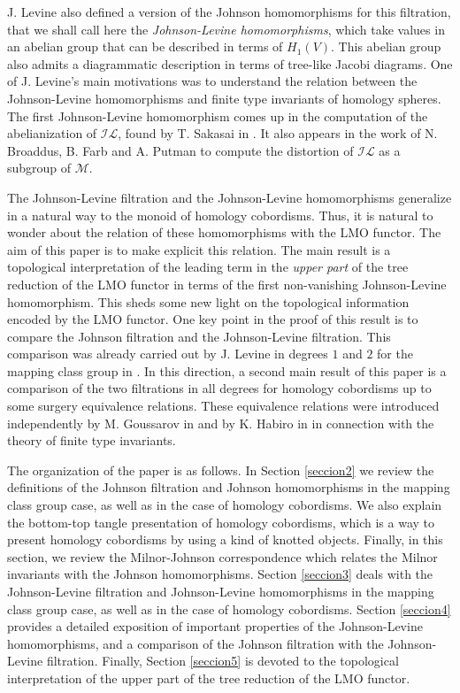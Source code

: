 \documentclass[10pt]{amsart}
\numberwithin{equation}{section}
\numberwithin{equation}{section}
\theoremstyle{definition}
\begin{document}
 J. Levine also  defined a version of the Johnson homomorphisms for this filtration, that we shall call here the  \emph{Johnson-Levine homomorphisms}, which take values in an abelian group  that can be described in terms of $H_1(V)$. This abelian group also admits a diagrammatic description in terms of tree-like Jacobi diagrams. One of J. Levine's  main motivations was to understand the  relation between  the Johnson-Levine homomorphisms  and finite type invariants of homology spheres.   The first Johnson-Levine homomorphism  comes up in the computation of the abelianization of $\mathcal{IL}$, found by T. Sakasai in \cite{MR2916276}. It also appears in the work of N. Broaddus, B. Farb and A. Putman  \cite{MR2803852} to compute the distortion of $\mathcal{IL}$ as a subgroup of $\mathcal{M}$. 

The Johnson-Levine filtration and the Johnson-Levine homomorphisms  generalize in a natural way to the monoid of homology cobordisms. Thus, it is natural to wonder about the relation of these homomorphisms with the LMO functor. The aim of this paper is to make explicit this relation.  The main result is a topological interpretation of the leading term in the  \emph{upper part} of the tree reduction of the LMO functor in terms of the first non-vanishing Johnson-Levine homomorphism. This sheds some new light on the topological information encoded by the LMO functor. One key point in the proof of this result is to compare the Johnson filtration and the Johnson-Levine filtration. This comparison was already carried out by J. Levine in degrees $1$ and $2$ for the mapping class group in \cite{MR2265877}. In this direction, a second main result of this paper is a comparison of the two filtrations in all degrees for homology cobordisms up to some surgery equivalence relations. These equivalence relations were introduced independently by M. Goussarov in \cite{MR1793618,MR1715131} and by K. Habiro in \cite{MR1735632} in connection with the theory of finite type invariants.

The organization of the paper is as follows. In Section \ref{seccion2} we review the definitions of the Johnson filtration and Johnson homomorphisms in the mapping class group case, as well as in the case of  homology cobordisms. We also  explain the bottom-top tangle presentation of homology cobordisms, which is a way to present homology cobordisms by using a kind of knotted objects. Finally, in this section,  we review the   Milnor-Johnson correspondence which relates the Milnor invariants with the Johnson homomorphisms.  Section \ref{seccion3} deals with the Johnson-Levine filtration and Johnson-Levine homomorphisms in the mapping class group case, as well as in the case of  homology cobordisms.  Section \ref{seccion4} provides a detailed exposition of important properties of the Johnson-Levine homomorphisms, and a comparison of the Johnson filtration with the Johnson-Levine filtration. Finally, Section \ref{seccion5} is devoted to the topological interpretation of the upper part of the tree reduction of the LMO functor.
\end{document}
